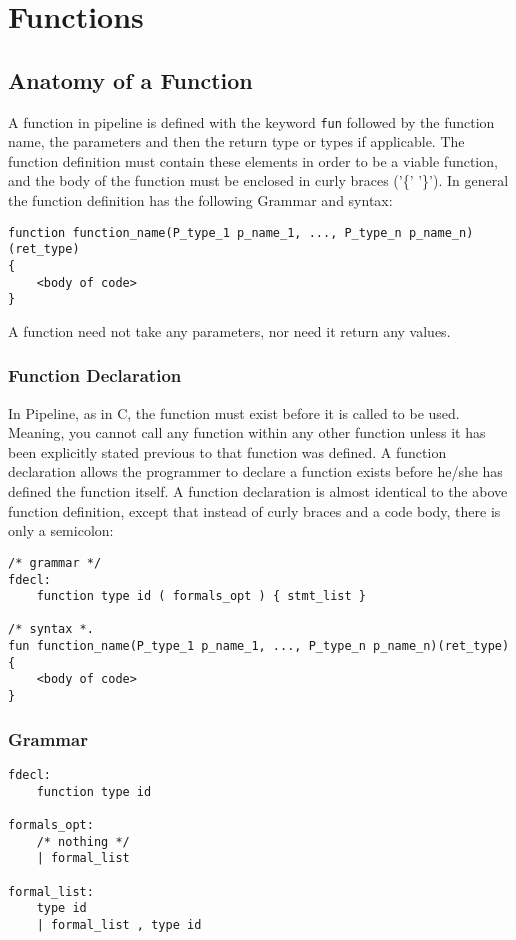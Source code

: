 \documentclass[./Report_main.tex]{subfiles}
\begin{document}
\section{Functions}
\subsection{Anatomy of a Function}
A function in pipeline is defined with the keyword \texttt{fun} followed by the function name, the parameters and then the return type or types if applicable. The function definition must contain these elements in order to be a viable function, and the body of the function must be enclosed in curly braces ('\{' '\}'). In general the function definition has the following Grammar and syntax:\\
\begin{lstlisting}
function function_name(P_type_1 p_name_1, ..., P_type_n p_name_n)(ret_type)
{
	<body of code>
}
\end{lstlisting}
A function need not take any parameters, nor need it return any values.
\subsubsection{Function Declaration}
In Pipeline, as in C, the function must exist before it is called to be used. Meaning, you cannot call any function within any other function unless it has been explicitly stated previous to that function was defined. A function declaration allows the programmer to declare a function exists before he/she has defined the function itself. A function declaration is almost identical to the above function definition, except that instead of curly braces and a code body, there is only a semicolon:
\begin{lstlisting}
/* grammar */
fdecl:
    function type id ( formals_opt ) { stmt_list }

/* syntax *.
fun function_name(P_type_1 p_name_1, ..., P_type_n p_name_n)(ret_type)
{
	<body of code>
}
\end{lstlisting}
\subsubsection{Grammar}
\begin{lstlisting}
fdecl:
    function type id

formals_opt:
    /* nothing */ 
    | formal_list  

formal_list:
    type id
    | formal_list , type id 

\end{lstlisting}
\end{document}
